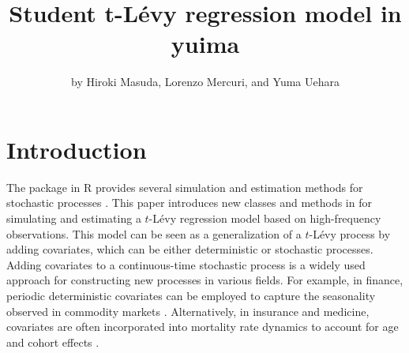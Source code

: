 \title{Student t-Lévy regression model in yuima}


\author{by Hiroki Masuda, Lorenzo Mercuri, and Yuma Uehara}

\maketitle


\section{Introduction}\label{Intro}

The  package in R provides several simulation and estimation methods for stochastic processes \citep{YUIMA, JSSv057i04, iacus2018simulation}.
This paper introduces new classes and methods in  for simulating and estimating a \(t\)-Lévy regression model based on high-frequency observations. This model can be seen as a generalization of a \(t\)-Lévy process \citep{HeyLeo05, Cuf07} by adding covariates, which can be either deterministic or stochastic processes.
Adding covariates to a continuous-time stochastic process is a widely used approach for constructing new processes in various fields. For example, in finance, periodic deterministic covariates can be employed to capture the seasonality observed in commodity markets \citep{sorensen2002modeling}. Alternatively, in insurance and medicine, covariates are often incorporated into mortality rate dynamics to account for age and cohort effects \citep[see][ and references therein]{HABERMAN2009255, castro2021trends}.

